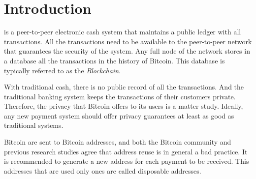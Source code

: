 \documentclass[journal]{IEEEtran}
\begin{document}
\section{Introduction}
%
%
%
%



 is a peer-to-peer electronic cash system \cite{nakamoto2008bpp} that maintains a public ledger with all transactions.
All the transactions need to be available to the peer-to-peer network that guarantees the security of the system.
Any full node of the network stores in a database all the transactions in the history of Bitcoin.
This database is typically referred to as the \emph{Blockchain}.

With traditional cash, there is no public record of all the transactions.
And the traditional banking system keeps the transactions of their customers private.
Therefore, the privacy that Bitcoin offers to its users is a matter study.
Ideally, any new payment system should offer privacy guarantees at least as good as traditional systems.

Bitcoin are sent to Bitcoin addresses, and both the Bitcoin community and previous research studies agree that address reuse is in general a bad practice.
It is recommended to generate a new address for each payment to be received.
This addresses that are used only ones are called disposable addresses.
\end{document}
